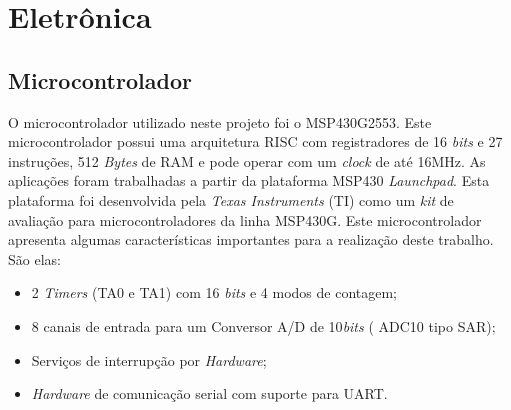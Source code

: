 \chapter{Eletrônica}
\label{eletronica}

\section{Microcontrolador} %
\label{sec:msp430}

O microcontrolador utilizado neste projeto foi o MSP430G2553. Este microcontrolador possui uma arquitetura RISC com registradores de 16 \textit{bits} e 27 instruções, 512 \textit{Bytes} de RAM e pode operar com um \textit{clock} de até 16MHz. As aplicações foram trabalhadas a partir da plataforma MSP430 \textit{Launchpad}. Esta plataforma foi desenvolvida pela \textit{Texas Instruments} (TI) como um \textit{kit} de avaliação para microcontroladores da linha MSP430G. Este microcontrolador apresenta algumas características importantes para a realização deste trabalho. São elas:
\begin {itemize}
	\item 2 \textit{Timers} (TA0 e TA1) com 16 \textit{bits} e 4 modos de contagem;
	\item 8 canais de entrada para um Conversor A/D de 10\textit{bits} ( ADC10 tipo SAR);
	\item Serviços de interrupção por \textit{Hardware};
	\item \textit{Hardware} de comunicação serial com suporte para UART.
\end {itemize}

